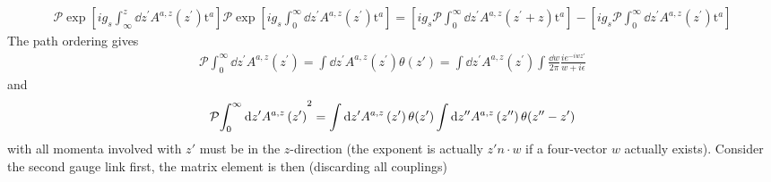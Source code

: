 \documentclass{article}
\DeclarePairedDelimiter\bracketM{[}{]}
\let\bqty\relax
\newcommand{\bqty}[1]{\bracketM*{#1}}
\begin{document}
\begin{align*}
	\mathcal{P} \exp\left[i g_s\int_{\infty}^{z} \dd z^{\prime} A^{a,z}\left(z^{\prime}\right) \mathrm{t}^{a}\right]\mathcal{P} \exp\left[i g_s\int_{0}^{\infty} \dd z^{\prime} A^{a,z}\left(z^{\prime}\right) \mathrm{t}^{a}\right]
	=\left[i g_s \mathcal{P} \int_{0}^{\infty} \dd z^{\prime} A^{a,z}\left(z^{\prime}+z\right) \mathrm{t}^{a}\right]-\left[i g_s \mathcal{P} \int_0^{\infty} \dd z^{\prime} A^{a,z}\left(z^{\prime}\right) \mathrm{t}^{a}\right]
\end{align*}
The path ordering gives
\begin{align}
	\mathcal{P} \int_{0}^{\infty} \dd z^{\prime} A^{a,z}\left(z^{\prime}\right) = \int \dd z^{\prime} A^{a,z}\left(z^{\prime}\right)\theta(z')=\int \dd z^{\prime} A^{a,z}\left(z^{\prime}\right)\int\frac{\dd w}{2\pi}\frac{ie^{-iwz' }}{w+i\epsilon}
\end{align}
and
\begin{align}
	\mathcal{P} \bqty{\int_{0}^{\infty} \dd z^{\prime} A^{a,z}\left(z^{\prime}\right)}^2 = \int \dd z^{\prime} A^{a,z}\left(z^{\prime}\right)\theta(z')\int \dd z^{\prime\prime} A^{a,z}\left(z^{\prime\prime}\right)\theta(z''-z')
\end{align}
with all momenta involved with $z'$ must be in the $z$-direction (the exponent is actually $z'n\cdot w$ if a four-vector $w$ actually exists). Consider the second gauge link first, the matrix element is then (discarding all couplings)
\end{document}
